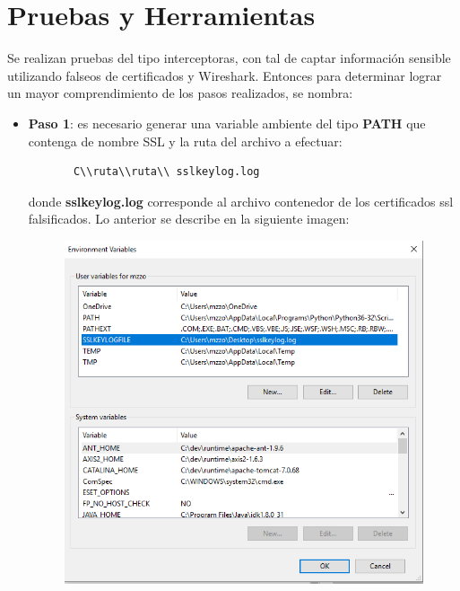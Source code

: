 \documentclass[a4paper,11pt]{article}
\theoremstyle{mytheor}
\begin{document}
\section{Pruebas y Herramientas}
Se realizan pruebas del tipo interceptoras, con tal de captar información sensible utilizando falseos de certificados y Wireshark. 
Entonces para determinar lograr un mayor comprendimiento de los pasos realizados, se nombra:



\begin{itemize}
    \item \textbf{Paso 1}: es necesario generar una variable ambiente del tipo \textbf{PATH} que contenga de nombre SSL y la ruta del archivo a efectuar: 
    
    \begin{verbatim}
       C\\ruta\\ruta\\ sslkeylog.log
    \end{verbatim}

    donde \textbf{sslkeylog.log} corresponde al archivo contenedor de los certificados ssl falsificados. Lo anterior se describe en la siguiente imagen:
    
    \begin{figure}[!h]
    \centering
    \includegraphics[scale=0.5]{sslpath.png}
    \label{fig:my_label}
    \end{figure}
    

\end{itemize}
\end{document}
